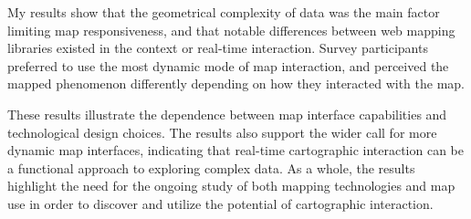 \begin{spacing}{1}
My results show that the geometrical complexity of data was the main factor limiting
map responsiveness, and that notable differences between web mapping libraries existed
in the context or real-time interaction.
Survey participants preferred to use the most dynamic mode of map interaction,
and perceived the mapped phenomenon differently depending on how they interacted with the map.

These results illustrate the dependence between map interface capabilities and technological design choices.
The results also support the wider call for more dynamic map interfaces,
indicating that real-time cartographic interaction can be a functional approach to exploring complex data.
As a whole, the results highlight the need for the ongoing study of both mapping technologies and map use
in order to discover and utilize the potential of cartographic interaction.

\end{spacing}
